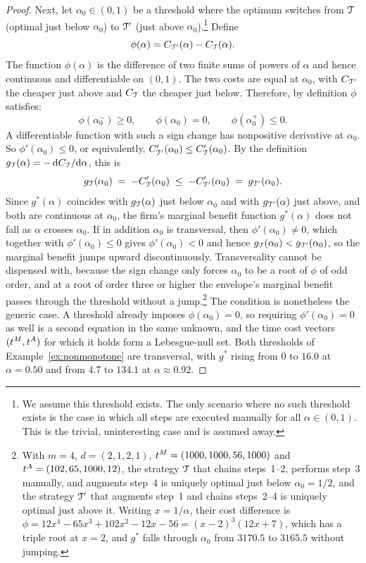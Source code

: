 \begin{proof}
Next, let $\alpha_0 \in (0,1)$ be a threshold where the optimum switches from $\mathcal{T}$ (optimal just below $\alpha_0$) to $\mathcal{T}'$ (just above $\alpha_0$).\footnote{We assume this threshold exists. The only scenario where no such threshold exists is the case in which all steps are executed manually for all $\alpha \in (0,1)$. This is the trivial, uninteresting case and is assumed away.}
Define
\[
\phi(\alpha) = C_{\mathcal{T}'}(\alpha) - C_{\mathcal{T}}(\alpha).
\]
The function $\phi(\alpha)$ is the difference of two finite sums of powers of $\alpha$ and hence continuous and differentiable on $(0,1)$. 
The two costs are equal at $\alpha_0$, with $C_{\mathcal{T}'}$ the cheaper just above and $C_{\mathcal{T}}$ the cheaper just below.
Therefore, by definition $\phi$ satisfies:
\[
\phi(\alpha_0^{-}) \ge 0,
\qquad
\phi(\alpha_0) = 0,
\qquad
\phi(\alpha_0^{+}) \le 0.
\]
A differentiable function with such a sign change has nonpositive derivative at $\alpha_0$.
So $\phi'(\alpha_0) \le 0$, or equivalently, $C_{\mathcal{T}'}'(\alpha_0) \le C_{\mathcal{T}}'(\alpha_0)$.
By the definition $g_{\mathcal{T}}(\alpha) = -\,\mathrm{d}C_{\mathcal{T}}/\mathrm{d}\alpha$, this is
\[
g_{\mathcal{T}}(\alpha_0) \;=\; -C_{\mathcal{T}}'(\alpha_0)
\;\le\;
-C_{\mathcal{T}'}'(\alpha_0) \;=\; g_{\mathcal{T}'}(\alpha_0).
\]
Since $g^*(\alpha)$ coincides with $g_{\mathcal{T}}(\alpha)$ just below $\alpha_0$ and with $g_{\mathcal{T}'}(\alpha)$ just above, and both are continuous at $\alpha_0$, the firm's marginal benefit function $g^*(\alpha)$ does not fall as $\alpha$ crosses $\alpha_0$.
If in addition $\alpha_0$ is transversal, then $\phi'(\alpha_0) \neq 0$, which together with $\phi'(\alpha_0) \le 0$ gives $\phi'(\alpha_0) < 0$ and hence $g_{\mathcal{T}}(\alpha_0) < g_{\mathcal{T}'}(\alpha_0)$, so the marginal benefit jumps upward discontinuously.
Transversality cannot be dispensed with, because the sign change only forces $\alpha_0$ to be a root of $\phi$ of odd order, and at a root of order three or higher the envelope's marginal benefit passes through the threshold without a jump.\footnote{With $m = 4$, $d = (2,1,2,1)$, $t^{M}_{} = (1000, 1000, 56, 1000)$ and $t^{A}_{} = (102, 65, 1000, 12)$, the strategy $\mathcal{T}$ that chains steps~1--2, performs step~3 manually, and augments step~4 is uniquely optimal just below $\alpha_0 = 1/2$, and the strategy $\mathcal{T}'$ that augments step~1 and chains steps~2--4 is uniquely optimal just above it. Writing $x = 1/\alpha$, their cost difference is $\phi = 12x^{4} - 65x^{3} + 102x^{2} - 12x - 56 = (x-2)^{3}(12x+7)$, which has a triple root at $x = 2$, and $g^*$ falls through $\alpha_0$ from $3170.5$ to $3165.5$ without jumping.}
The condition is nonetheless the generic case.
A threshold already imposes $\phi(\alpha_0) = 0$, so requiring $\phi'(\alpha_0) = 0$ as well is a second equation in the same unknown, and the time cost vectors $(t^{M}_{}, t^{A}_{})$ for which it holds form a Lebesgue-null set.
Both thresholds of Example~\ref{ex:nonmonotone} are transversal, with $g^*$ rising from $0$ to $16.0$ at $\alpha = 0.50$ and from $4.7$ to $134.1$ at $\alpha \approx 0.92$.
\end{proof}


